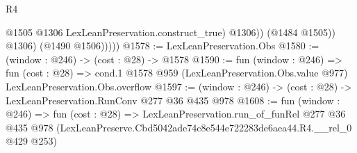 \begin{lexlean}{R4}
\begin{coremodule}
                      @1505
                      @1306
                      LexLeanPreservation.construct_true)
                    @1306))
                (@1484 @1505))
              @1306)
            (@1490 @1506)))))
@1578 := LexLeanPreservation.Obs
@1580 := (window : @246) -> (cost : @28) -> @1578
@1590 := fun (window : @246) =>
  fun (cost : @28) =>
  cond.{1} @1578 @959 (LexLeanPreservation.Obs.value @977) LexLeanPreservation.Obs.overflow
@1597 := (window : @246) -> (cost : @28) -> LexLeanPreservation.RunConv @277 @36 @435 @978
@1608 := fun (window : @246) =>
  fun (cost : @28) =>
  LexLeanPreservation.run_of_funRel
    @277
    @36
    @435
    @978
    (LexLeanPreserve.Cbd5042ade74c8e544e722283de6aea44.R4.__rel_0 @429 @253)
\end{coremodule}
\end{lexlean}
